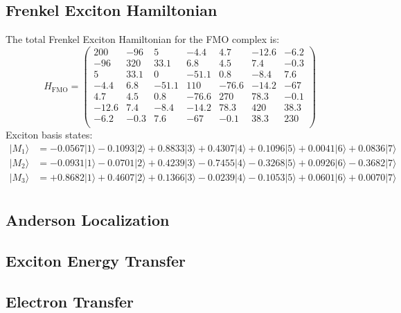 \documentclass[9pt]{report}
\begin{document}
\subsection{Frenkel Exciton Hamiltonian}
The total Frenkel Exciton Hamiltonian for the FMO complex is:
\begin{equation}
\renewcommand{\arraystretch}{1.2}
H_{\mathrm{FMO}} =
\left(\begin{array}{ccccccc}
200 & -96  &  5  &  -4.4  &  4.7  &  -12.6  &  -6.2
\\
-96  &  320  &  33.1  &  6.8  &  4.5  &  7.4  &  -0.3
\\
5  &  33.1  &  0  &  -51.1  &  0.8  &  -8.4  &  7.6
\\
-4.4  &  6.8  &  -51.1  &  110  &  -76.6  &  -14.2  &  -67
\\
4.7  &  4.5  &  0.8  &  -76.6  &  270  &  78.3  &  -0.1
\\
-12.6  &  7.4  &  -8.4  &  -14.2  &  78.3  &  420  &  38.3
\\
-6.2  &  -0.3  &  7.6  &  -67  &  -0.1  &  38.3  &  230
\\
\end{array}\right)
\end{equation}
Exciton basis states:
\begin{align}
|M_1\rangle &= -0.0567|1\rangle-0.1093|2\rangle+0.8833|3\rangle+0.4307|4\rangle+0.1096|5\rangle+0.0041|6\rangle+0.0836|7\rangle\\
|M_2\rangle &= -0.0931|1\rangle-0.0701|2\rangle+0.4239|3\rangle-0.7455|4\rangle-0.3268|5\rangle+0.0926|6\rangle-0.3682|7\rangle\\
|M_3\rangle &= +0.8682|1\rangle+0.4607|2\rangle+0.1366|3\rangle-0.0239|4\rangle-0.1053|5\rangle+0.0601|6\rangle+0.0070|7\rangle\\
\end{align}

\subsection{Anderson Localization}

\subsection{Exciton Energy Transfer}

\subsection{Electron Transfer}
\end{document}
